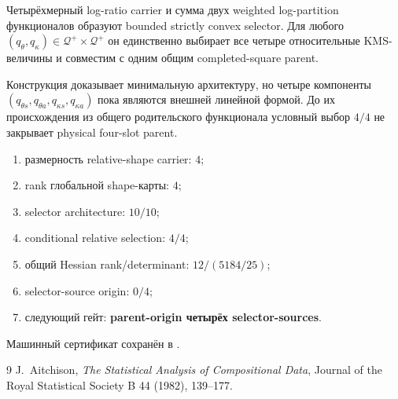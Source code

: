 \begin{theorem}
Четырёхмерный log-ratio carrier и сумма двух weighted log-partition
функционалов образуют bounded strictly convex selector. Для любого
$(q_\theta,q_\kappa)\in\mathcal Q^+\times\mathcal Q^+$ он единственно
выбирает все четыре относительные KMS-величины и совместим с одним общим
completed-square parent.
\end{theorem}

\begin{nogocriterion}
Конструкция доказывает минимальную архитектуру, но четыре компоненты
$(q_{\theta s},q_{\theta a},q_{\kappa s},q_{\kappa a})$ пока являются
внешней линейной формой. До их происхождения из общего родительского функционала условный
выбор $4/4$ не закрывает physical four-slot parent.
\end{nogocriterion}

\begin{protocol}\begin{enumerate}
\item размерность relative-shape carrier: \textbf{$4$};
\item rank глобальной shape-карты: \textbf{$4$};
\item selector architecture: \textbf{$10/10$};
\item conditional relative selection: \textbf{$4/4$};
\item общий Hessian rank/determinant: \textbf{$12/(5184/25)$};
\item selector-source origin: \textbf{$0/4$};
\item следующий гейт: \textbf{parent-origin четырёх selector-sources}.
\end{enumerate}\end{protocol}

Машинный сертификат сохранён в
.

\begin{thebibliography}{9}
J.~Aitchison, \emph{The Statistical Analysis of Compositional Data},
Journal of the Royal Statistical Society B 44 (1982), 139--177.
\end{thebibliography}